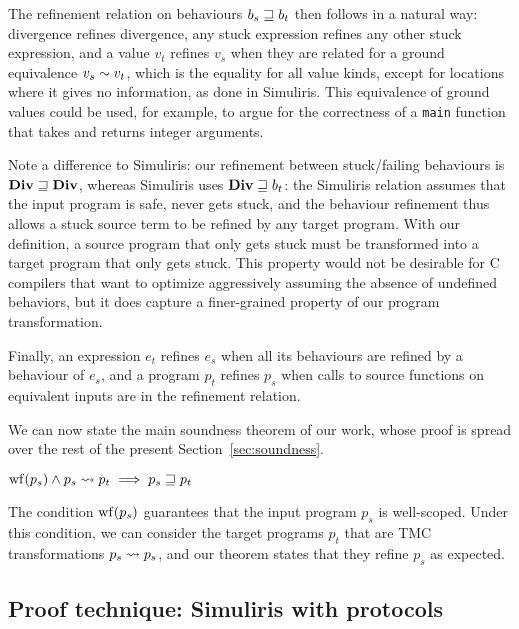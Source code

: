 The refinement relation on behaviours $b_s \sqsupseteq b_t$ then follows in a natural way: divergence refines divergence, any stuck expression refines any other stuck expression, and a value $v_t$ refines $v_s$ when they are related for a ground equivalence $v_s \sim v_t$, which is the equality for all value kinds, except for locations where it gives no information, as done in Simuliris.
%
This equivalence of ground values could be used, for example, to argue for the correctness of a \texttt{main} function that takes and returns integer arguments.

Note a difference to Simuliris: our refinement between stuck/failing behaviours is $\constr{Div} \refined \constr{Div}$, whereas Simuliris uses $\constr{Div} \refined b_t$: the Simuliris relation assumes that the input program is safe, never gets stuck, and the behaviour refinement thus allows a stuck source term to be refined by any target program. With our definition, a source program that only gets stuck must be transformed into a target program that only gets stuck.
%
This property would not be desirable for C compilers that want to optimize aggressively assuming the absence of undefined behaviors, but it does capture a finer-grained property of our program transformation.

Finally, an expression $e_t$ refines $e_s$ when all its behaviours are refined by a behaviour of $e_s$, and a program $p_t$ refines $p_s$ when calls to source functions on equivalent inputs are in the refinement relation.




We can now state the main soundness theorem of our work, whose proof is spread over the rest of the present Section~\ref{sec:soundness}.

\begin{theorem}[Soundness]
    $
        \wf{p_s} \wedge p_s \tmc p_t \implies
        p_s \refined p_t
    $
\end{theorem}

The condition $\wf{p_s}$ guarantees that the input program $p_s$ is well-scoped. Under this condition, we can consider the target programs $p_t$ that are TMC transformations $p_s \rightsquigarrow p_s$, and our theorem states that they refine $p_s$ as expected.

\subsection{Proof technique: Simuliris with protocols}

